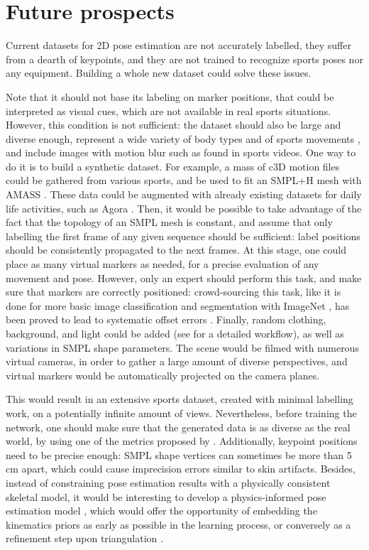 
\section*{Future prospects}
Current datasets for 2D pose estimation are not accurately labelled, they suffer from a dearth of keypoints, and they are not trained to recognize sports poses nor any equipment. Building a whole new dataset could solve these issues.

Note that it should not base its labeling on marker positions, that could be interpreted as visual cues, which are not available in real sports situations. However, this condition is not sufficient: the dataset should also be large and diverse enough, represent a wide variety of body types and of sports movements \cite{Seethapathi2019}, and include images with motion blur such as found in sports videos. One way to do it is to build a synthetic dataset. For example, a mass of c3D motion files could be gathered from various sports, and be used to fit an SMPL+H mesh \cite{Pavlakos2019} with AMASS \cite{Mahmood2019}. These data could be augmented with already existing datasets for daily life activities, such as Agora \cite{Patel2021}. Then, it would be possible to take advantage of the fact that the topology of an SMPL mesh is constant, and assume that only labelling the first frame of any given sequence should be sufficient: label positions should be consistently propagated to the next frames. At this stage, one could place as many virtual markers as needed, for a precise evaluation of any movement and pose. However, only an expert should perform this task, and make sure that markers are correctly positioned: crowd-sourcing this task, like it is done for more basic image classification and segmentation with ImageNet \cite{Deng2009}, has been proved to lead to systematic offset errors \cite{Needham2021b}. Finally, random clothing, background, and light could be added (see \cite{Wood2021,Bolanos2021} for a detailed workflow), as well as variations in SMPL shape parameters. The scene would be filmed with numerous virtual cameras, in order to gather a large amount of diverse perspectives, and virtual markers would be automatically projected on the camera planes. 

This would result in an extensive sports dataset, created with minimal labelling work, on a potentially infinite amount of views. Nevertheless, before training the network, one should make sure that the generated data is as diverse as the real world, by using one of the metrics proposed by \cite{Borji2019, Borji2022}. Additionally, keypoint positions need to be precise enough: SMPL shape vertices can sometimes be more than 5 cm apart, which could cause imprecision errors similar to skin artifacts. Besides, instead of constraining pose estimation results with a physically consistent skeletal model, it would be interesting to develop a physics-informed pose estimation model \cite{Raissi2019,Xu2020a}, which would offer the opportunity of embedding the kinematics priors as early as possible in the learning process, or conversely as a refinement step upon triangulation \cite{Hua2022}.


